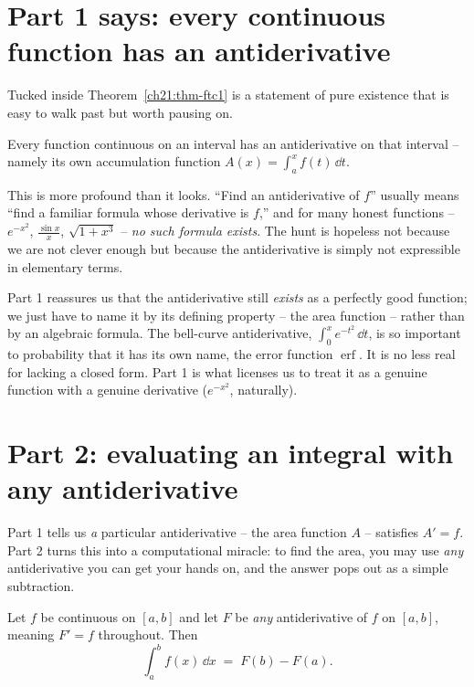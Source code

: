 \section{Part 1 says: every continuous function has an antiderivative}

Tucked inside Theorem~\ref{ch21:thm-ftc1} is a statement of pure existence that
is easy to walk past but worth pausing on.

\begin{corollary}\label{ch21:cor-exist}
Every function continuous on an interval has an antiderivative on that interval --
namely its own accumulation function $A(x)=\int_a^x f(t)\,\dd t$.
\end{corollary}

\begin{aestheticbox}
This is more profound than it looks. ``Find an antiderivative of $f$'' usually
means ``find a familiar formula whose derivative is $f$,'' and for many honest
functions -- $e^{-x^2}$, $\frac{\sin x}{x}$, $\sqrt{1+x^3}$ -- \emph{no such
formula exists}. The hunt is hopeless not because we are not clever enough but
because the antiderivative is simply not expressible in elementary terms.

Part 1 reassures us that the antiderivative still \emph{exists} as a perfectly
good function; we just have to name it by its defining property -- the area
function -- rather than by an algebraic formula. The bell-curve antiderivative,
$\int_0^x e^{-t^2}\,\dd t$, is so important to probability that it has its own
name, the error function $\operatorname{erf}$. It is no less real for lacking a
closed form. Part 1 is what licenses us to treat it as a genuine function with a
genuine derivative ($e^{-x^2}$, naturally).
\end{aestheticbox}

\section{Part 2: evaluating an integral with any antiderivative}

Part 1 tells us \emph{a} particular antiderivative -- the area function $A$ --
satisfies $A'=f$. Part 2 turns this into a computational miracle: to find the
area, you may use \emph{any} antiderivative you can get your hands on, and the
answer pops out as a simple subtraction.

\begin{theorem}\label{ch21:thm-ftc2}
Let $f$ be continuous on $[a,b]$ and let $F$ be \emph{any} antiderivative of $f$
on $[a,b]$, meaning $F'=f$ throughout. Then
\[
  \int_a^b f(x)\,\dd x \;=\; F(b)-F(a).
\]
\end{theorem}

